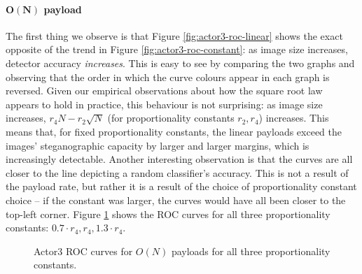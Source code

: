 \documentclass[11pt,a4paper,twoside,openright]{report}
\begin{document}
\paragraph{$\bm{O(N)}$ payload} The first thing we observe is that Figure \ref{fig:actor3-roc-linear} shows the exact opposite of the trend in Figure \ref{fig:actor3-roc-constant}: as image size increases, detector accuracy \textit{increases}. This is easy to see by comparing the two graphs and observing that the order in which the curve colours appear in each graph is reversed. Given our empirical observations about how the square root law appears to hold in practice, this behaviour is not surprising: as image size increases, $r_4N - r_2\sqrt{N}$ (for proportionality constants $r_2, r_4$) increases. This means that, for fixed proportionality constants, the linear payloads exceed the images' steganographic capacity by larger and larger margins, which is increasingly detectable. Another interesting observation is that the curves are all closer to the line depicting a random classifier's accuracy. This is not a result of the payload rate, but rather it is a result of the choice of proportionality constant choice -- if the constant was larger, the curves would have all been closer to the top-left corner. Figure \ref{fig:actor3-roc-linear-all-constants} shows the ROC curves for all three proportionality constants: $0.7 \cdot r_4, r_4, 1.3 \cdot r_4$.

\begin{figure}[htbp]
    \centering
    \caption{Actor3 ROC curves for $O(N)$ payloads for all three proportionality constants.}
    \label{fig:actor3-roc-linear-all-constants}
\end{figure}
\end{document}

